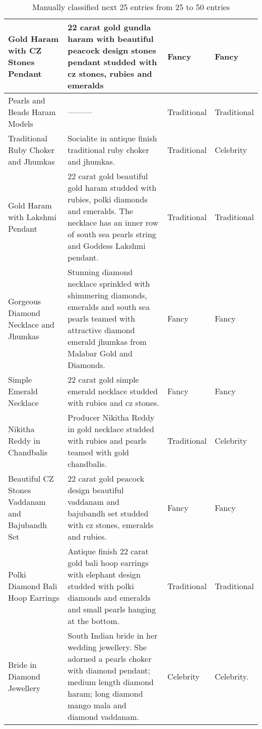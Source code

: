 \begin{table}
\begin{tabular}{ | p{5.0cm} | p{8.4cm} | p{1.5cm} | p{1.5cm} | }
\hline
Gold Haram with CZ Stones Pendant & 22 carat gold gundla haram with beautiful peacock design stones pendant studded with cz stones, rubies and emeralds & Fancy  & Fancy\\
\hline
Pearls and Beads Haram Models & ---------& Traditional & Traditional\\
\hline
Traditional Ruby Choker and Jhumkas & Socialite in antique finish traditional ruby choker and jhumkas. & Traditional & Celebrity\\
\hline
Gold Haram with Lakshmi Pendant & 22 carat gold beautiful gold haram studded with rubies, polki diamonds and emeralds. The necklace has an inner row of south sea pearls string and Goddess Lakshmi pendant. & Traditional & Traditional\\
\hline
Gorgeous Diamond Necklace and Jhumkas & Stunning diamond necklace sprinkled with shimmering diamonds, emeralds and south sea pearls teamed with attractive diamond emerald jhumkas from Malabar Gold and Diamonds. & Fancy & Fancy\\
\hline
Simple Emerald Necklace & 22 carat gold simple emerald necklace studded with rubies and cz stones. & Fancy & Fancy\\
\hline
Nikitha Reddy in Chandbalis & Producer Nikitha Reddy in gold necklace studded with rubies and pearls teamed with gold chandbalis. & Traditional & Celebrity\\
\hline
 Beautiful CZ Stones Vaddanam and Bajubandh Set & 22 carat gold peacock design beautiful vaddanam and bajubandh set studded with cz stones, emeralds and rubies. & Fancy & Fancy \\
\hline
Polki Diamond Bali Hoop Earrings & Antique finish 22 carat gold bali hoop earrings with elephant design studded with polki diamonds and emeralds and small pearls hanging at the bottom. & Traditional & Traditional\\
\hline
Bride in Diamond Jewellery	& South Indian bride in her wedding jewellery. She adorned a pearls choker with diamond pendant; medium length diamond haram; long diamond mango mala and diamond vaddanam. & Celebrity & Celebrity.\\
\hline
\end{tabular}
\caption{Manually classified next 25 entries from 25 to 50 entries }
\label{table:q2-2}
\end{table}
\newpage

